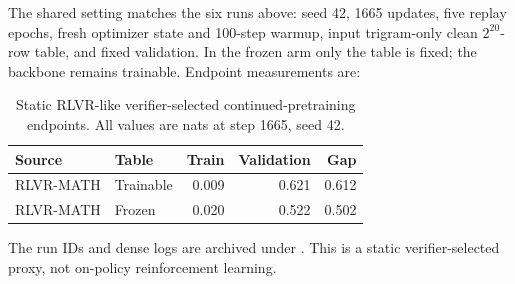 The shared setting matches the six runs above: seed 42, 1665 updates, five replay epochs, fresh optimizer state and 100-step warmup, input trigram-only clean $2^{20}$-row table, and fixed validation. In the frozen arm only the table is fixed; the backbone remains trainable. Endpoint measurements are:
\begin{table}[!htbp]
\centering\small
\caption{Static RLVR-like verifier-selected continued-pretraining endpoints. All values are nats at step 1665, seed 42.}
\label{tab:rlvr-results}
\begin{tabular}{llrrr}
\toprule
Source & Table & Train & Validation & Gap\\
\midrule
RLVR-MATH & Trainable & 0.009 & 0.621 & 0.612\\
RLVR-MATH & Frozen & 0.020 & 0.522 & 0.502\\
\bottomrule
\end{tabular}
\end{table}

The run IDs and dense logs are archived under . This is a static verifier-selected proxy, not on-policy reinforcement learning.
